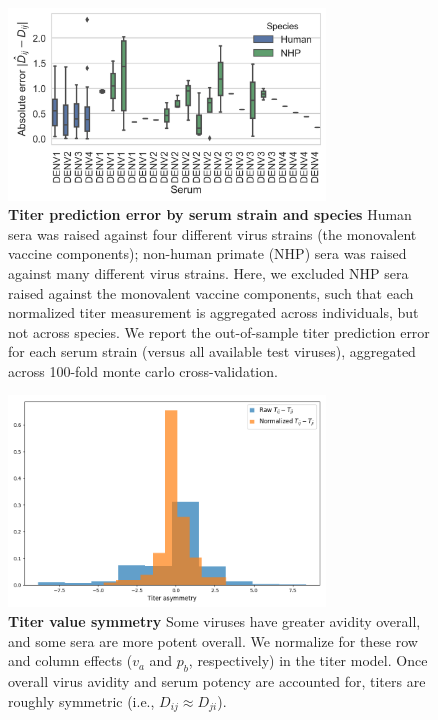 \documentclass[11pt,oneside,letterpaper]{article}
\begin{document}
\begin{figure}[ht]
\centering
	\includegraphics[width=0.75\textwidth]{../figures/png/titer_species_error.png}
	\caption{\textbf{Titer prediction error by serum strain and species}
  Human sera was raised against four different virus strains (the monovalent vaccine components); non-human primate (NHP) sera was raised against many different virus strains.
  Here, we excluded NHP sera raised against the monovalent vaccine components, such that each normalized titer measurement is aggregated across individuals, but not across species.
  We report the out-of-sample titer prediction error for each serum strain (versus all available test viruses), aggregated across 100-fold monte carlo cross-validation.
	}
	\label{species_titers}
\end{figure}


\begin{figure}[ht]
  \centering
  \includegraphics[width=0.75\textwidth]{../figures/png/titer_asymmetry.png}
  \caption{\textbf{Titer value symmetry}
  Some viruses have greater avidity overall, and some sera are more potent overall.
  We normalize for these row and column effects ($v_a$ and $p_b$, respectively) in the titer model.
  Once overall virus avidity and serum potency are accounted for, titers are roughly symmetric (i.e., $D_{ij} \approx D_{ji}$).
  }
\label{titer_asymmetry}
\end{figure}
\end{document}
